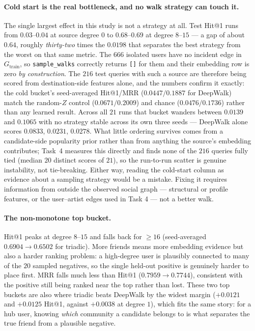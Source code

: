 \paragraph{Cold start is the real bottleneck, and no walk strategy can touch it.}
The single largest effect in this study is not a strategy at all.  Test Hit@1 runs from
$0.03$--$0.04$ at source degree $0$ to $0.68$--$0.69$ at degree $8$--$15$ --- a gap of
about $0.64$, roughly \emph{thirty-two} times the $0.0198$ that separates the best
strategy from the worst on that same metric.
The $666$ isolated users have no incident edge in $G_{\mathrm{train}}$, so
\texttt{sample\_walks} correctly returns \texttt{[]} for them and their embedding row is
zero \emph{by construction}.  The $216$ test queries with such a source are therefore
being scored from destination-side features alone, and the numbers confirm it exactly:
the cold bucket's seed-averaged Hit@1/MRR ($0.0447/0.1887$ for DeepWalk) match the
random-$Z$ control ($0.0671/0.2009$) and chance ($0.0476/0.1736$) rather than any learned
result.  Across all $21$ runs that bucket wanders between $0.0139$ and $0.1065$ with no
strategy stable across its own three seeds --- DeepWalk alone scores $0.0833$, $0.0231$,
$0.0278$.  What little ordering survives comes from a candidate-side popularity prior
rather than from anything the source's embedding contributes; Task~4 measures this
directly and finds none of the $216$ queries fully tied (median $20$ distinct scores of
$21$), so the run-to-run scatter is genuine instability, not tie-breaking.  Either way,
reading the cold-start column as evidence about a sampling strategy would be a mistake.  Fixing it
requires information from outside the observed social graph --- structural or profile
features, or the user--artist edges used in Task 4 --- not a better walk.

\paragraph{The non-monotone top bucket.}
Hit@1 peaks at degree $8$--$15$ and falls back for $\ge 16$ (seed-averaged
$0.6904 \to 0.6502$ for triadic).  More friends means more embedding evidence but also a
harder ranking problem: a high-degree user is plausibly connected to many of the $20$
sampled negatives, so the single held-out positive is genuinely harder to place first.
MRR falls much less than Hit@1 ($0.7959\to0.7744$), consistent with the positive still
being ranked near the top rather than lost.  These two top buckets are also where triadic
beats DeepWalk by the widest margin ($+0.0121$ and $+0.0125$ Hit@1, against $+0.0038$ at
degree $1$), which fits the same story: for a hub user, knowing \emph{which} community a
candidate belongs to is what separates the true friend from a plausible negative.


